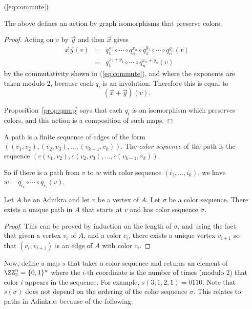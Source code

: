 

 (\ref{eq:commute})
\begin{prop}
\label{prop:actioniso}
The above defines an action by graph isomorphisms that preserve colors.
\end{prop}
\begin{proof}
Acting on $v$ by $\vec{y}$ and then $\vec{x}$ gives
\begin{eqnarray*}
\vec{x}\vec{y}(v)
&=&q_1^{x_1}\circ\cdots\circ q_n^{x_n}\circ
q_1^{y_1}\circ\cdots\circ q_n^{y_n}(v)\\
&=&q_1^{x_1+y_1}\circ\cdots\circ q_n^{x_n+y_n}(v)
\end{eqnarray*}
by the commutativity shown in (\ref{eq:commute}), and where the exponents are taken modulo $2$, because each $q_i$ is an involution.  Therefore this is equal to
\[(\vec{x}+\vec{y})(v).\]

Proposition~\ref{prop:qmap} says that each $q_i$ is an isomorphism which preserves colors, and this action is a composition of such maps.
\end{proof}



\begin{definition}
A path is a finite sequence of edges of the form $((v_1,v_2),(v_2,v_3),\ldots,(v_{k-1},v_k))$.  The {\em color sequence} of the path is the sequence $(c(v_1,v_2),c(v_2,v_3),\ldots,c(v_{k-1},v_k))$.
\end{definition}

So if there is a path from $v$ to $w$ with color sequence $(i_1, \ldots, i_k)$, we have $w=q_{i_k}\circ \cdots\circ q_{i_1}(v)$.

\begin{prop}
\label{prop:colorpath}
Let $A$ be an Adinkra and let $v$ be a vertex of $A$.  Let $\sigma$ be a color sequence.  There exists a unique path in $A$ that starts at $v$ and has color sequence $\sigma$.
\end{prop}
\begin{proof}
This can be proved by induction on the length of $\sigma$, and using the fact that given a vertex $v_i$ of $A$, and a color $c_i$, there exists a unique vertex $v_{i+1}$ so that $(v_i,v_{i+1})$ is an edge of $A$ with color $c_i$.
\end{proof}

Now, define a map $s$ that takes a color sequence and returns an element of $\ZZ_2^n=\{0,1\}^n$ where the $i$-th coordinate is the number of times (modulo $2$) that color $i$ appears in the sequence. For example, $s(3,1,2,1) = 0110$.  Note that $s(\sigma)$ does not depend on the ordering of the color sequence $\sigma$.  This relates to paths in Adinkras because of the following:

